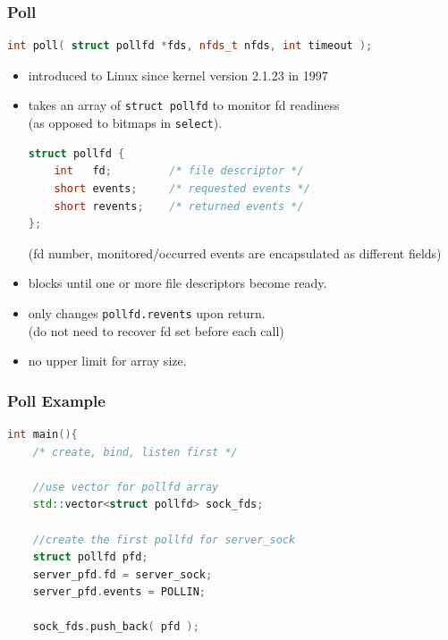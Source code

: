\documentclass[aspectratio=43]{beamer}
\begin{document}
\begin{frame}[fragile]
  \frametitle{Poll}
  \begin{lstlisting}[language=C++,basicstyle=\ttfamily\footnotesize,commentstyle=\color{commgreen},keywordstyle=\color{blue},breaklines=true]
int poll( struct pollfd *fds, nfds_t nfds, int timeout );   
\end{lstlisting}
   \begin{itemize}
	 \item introduced to Linux since kernel version 2.1.23 in 1997
	 \item takes an array of {\tt struct pollfd} to monitor fd readiness\\{\scriptsize (as opposed to bitmaps in {\tt select})}.
	 \begin{lstlisting}[language=C++,basicstyle=\ttfamily\scriptsize,commentstyle=\color{commgreen},keywordstyle=\color{blue},breaklines=true]
struct pollfd {
    int   fd;         /* file descriptor */
    short events;     /* requested events */
    short revents;    /* returned events */
};
\end{lstlisting}
	 {\scriptsize (fd number, monitored/occurred events are encapsulated as different fields) }
	 \item blocks until one or more file descriptors become ready.
	 \item only changes {\tt pollfd.revents} upon return.\\ {\scriptsize (do not need to recover fd set before each call)}
	 \item no upper limit for array size.
   \end{itemize}
\end{frame}

\begin{frame}[fragile]
  \frametitle{Poll Example}
\begin{lstlisting}[language=C++,basicstyle=\ttfamily\footnotesize,commentstyle=\color{commgreen},keywordstyle=\color{blue},breaklines=true]
int main(){
    /* create, bind, listen first */
    
    //use vector for pollfd array
    std::vector<struct pollfd> sock_fds;

    //create the first pollfd for server_sock
    struct pollfd pfd;
    server_pfd.fd = server_sock;
    server_pfd.events = POLLIN;
    
    sock_fds.push_back( pfd );

    \end{lstlisting}
\end{frame}
\end{document}
